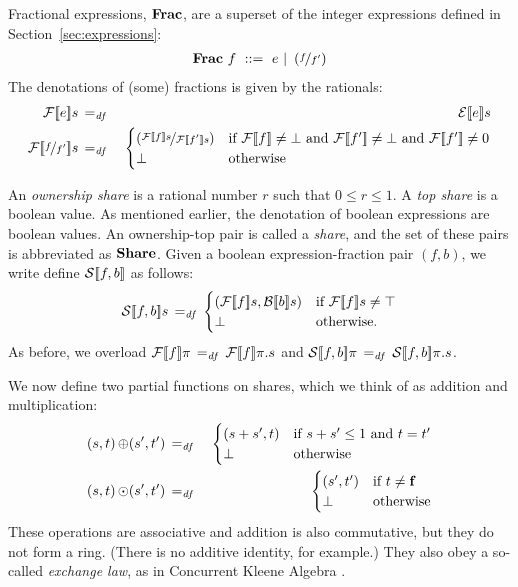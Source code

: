 \documentclass[11pt]{report}
\begin{document}
Fractional expressions, $\mathbf{Frac}$, are a superset of the integer expressions defined in Section~\ref{sec:expressions}: \begin{align*}
	\mathbf{Frac}~f ~::=~ e ~|~ \left(\nicefrac{f}{f'}\right)
\end{align*}
The denotations of (some) fractions is given by the rationals: \begin{eqnarray*}
	\dnfrac{e}s & \eqdef & \dnexpr{e}s \\
	\dnfrac{\nicefrac{f}{f'}}s & \eqdef & \begin{cases} 
		\left(\nicefrac{\dnfrac{f}s}{\dnfrac{f'}s}\right) & \text{if $\dnfrac{f} \neq \bot$ and $\dnfrac{f'} \neq \bot$ and $\dnfrac{f'} \neq 0$} \\
		\bot & \text{otherwise} 
	\end{cases}
\end{eqnarray*} 

An \emph{ownership share} is a rational number $r$ such that $0 \leq r \leq 1$. A \emph{top share} is a boolean value. As mentioned earlier, the denotation of boolean expressions are boolean values. An ownership-top pair is called a \emph{share}, and the set of these pairs is abbreviated as $\mathbf{Share}$. Given a boolean expression-fraction pair $(f,b)$, we write define $\mathcal{S}[\![f,b]\!]$ as follows: \[ \dnshare{f,b}s \eqdef \begin{cases}
	(\dnfrac{f}s,\dnbexpr{b}s) & \text{if $\dnfrac{f}s \neq \top$} \\
	\bot & \text{otherwise.}
\end{cases} \] As before, we overload $\mathcal{F}[\![f]\!]\pi \operatorname{\;=_{\mathit{df}}\;} \mathcal{F}[\![f]\!]\pi.s$ and $\mathcal{S}[\![f,b]\!]\pi \operatorname{\;=_{\mathit{df}}\;} \mathcal{S}[\![f,b]\!]\pi.s$. 

We now define two partial functions on shares, which we think of as addition and multiplication: \begin{eqnarray}
	(s,t) \operatorname{\oplus} (s',t') & \operatorname{\;=_{\mathit{df}}\;} & \begin{cases}
		(s+s',t) & \text{if $s + s' \leq 1$ and $t = t'$} \\
		\bot & \text{otherwise}
	\end{cases} \\
	(s,t) \operatorname{\odot} (s',t') & \operatorname{\;=_{\mathit{df}}\;} & \begin{cases}
		(s',t') & \text{if $t \neq \mathbf{f}$} \\
		\bot & \text{otherwise}
	\end{cases}
\end{eqnarray} 
These operations are associative and addition is also commutative, but they do not form a ring. (There is no additive identity, for example.) They also obey a so-called \emph{exchange law}, as in Concurrent Kleene Algebra \cite{DBLP:journals/ipl/WehrmanHO09, DBLP:conf/concur/HoareMSW09, DBLP:conf/RelMiCS/HoareMSW09, DBLP:journals/jlp/HoareMSW11}. 
\end{document}
